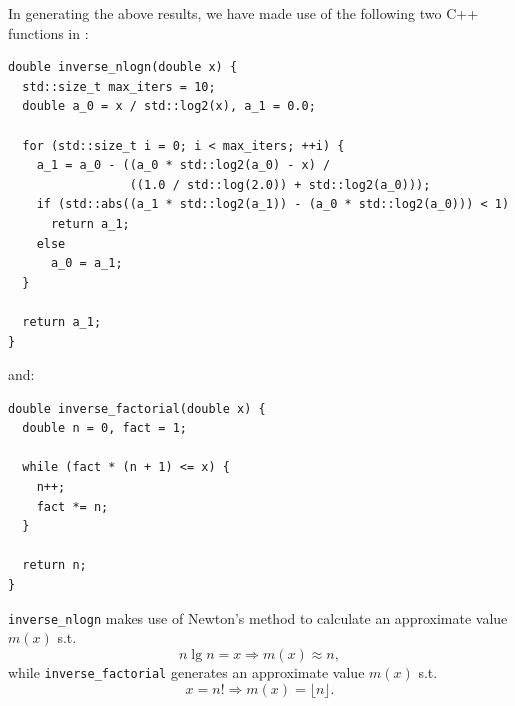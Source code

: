 \qquad In generating the above results, we have made use of the following two C++
functions in :
\small\begin{verbatim}
double inverse_nlogn(double x) {
  std::size_t max_iters = 10;
  double a_0 = x / std::log2(x), a_1 = 0.0;

  for (std::size_t i = 0; i < max_iters; ++i) {
    a_1 = a_0 - ((a_0 * std::log2(a_0) - x) /
                 ((1.0 / std::log(2.0)) + std::log2(a_0)));
    if (std::abs((a_1 * std::log2(a_1)) - (a_0 * std::log2(a_0))) < 1)
      return a_1;
    else
      a_0 = a_1;
  }

  return a_1;
}
\end{verbatim}\normalsize
and:
\small\begin{verbatim}
double inverse_factorial(double x) {
  double n = 0, fact = 1;

  while (fact * (n + 1) <= x) {
    n++;
    fact *= n;
  }

  return n;
}
\end{verbatim}\normalsize
\texttt{inverse\_nlogn} makes use of Newton's method to calculate an approximate
value $m(x)$ s.t.
\[
  n\lg{n} = x \Rightarrow m(x) \approx n,
\]
while \texttt{inverse\_factorial} generates an approximate value $m(x)$ s.t.
\[
  x = n! \Rightarrow m(x) = \lfloor n \rfloor.
\]
